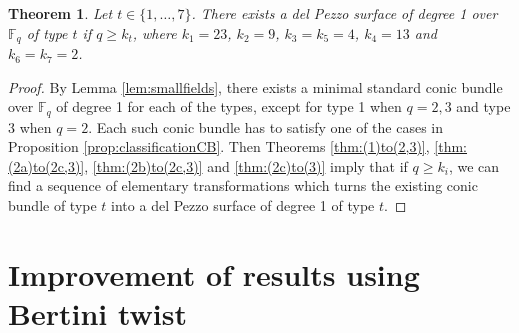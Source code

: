 \documentclass[a4paper, 11pt, reqno]{amsart}
\numberwithin{equation}{section} \numberwithin{figure}{section}
\def \F {{\mathbb F}}
\newtheorem{theorem}[lemma]{Theorem}
\theoremstyle{definition}
\numberwithin{lemma}{section}
\begin{document}
\begin{theorem}\label{thm:mainthmpart1}
Let $t \in \{1, \ldots, 7\}$. There exists a del Pezzo surface of degree 1 over $\F_q$ of type $t$ if $q \geq k_t$, where $k_1 = 23$, $k_2 = 9$, $k_3 = k_5 = 4$, $k_4 = 13$ and $k_6 = k_7 = 2$.

\end{theorem}

\begin{proof}
    By Lemma \ref{lem:smallfields}, there exists a minimal standard conic bundle over $\F_q$ of degree 1 for each of the types, except for type 1 when $q = 2, 3$ and type 3 when $q = 2$. Each such conic bundle has to satisfy one of the cases in Proposition \ref{prop:classificationCB}. Then Theorems \ref{thm:(1)to(2,3)}, \ref{thm:(2a)to(2c,3)}, \ref{thm:(2b)to(2c,3)} and \ref{thm:(2c)to(3)} imply that if $q \geq k_i$, we can find a sequence of elementary transformations which turns the existing conic bundle of type $t$ into a del Pezzo surface of degree 1 of type $t$.
\end{proof}

\section{Improvement of results using Bertini twist} \label{sec:method2}
\end{document}
